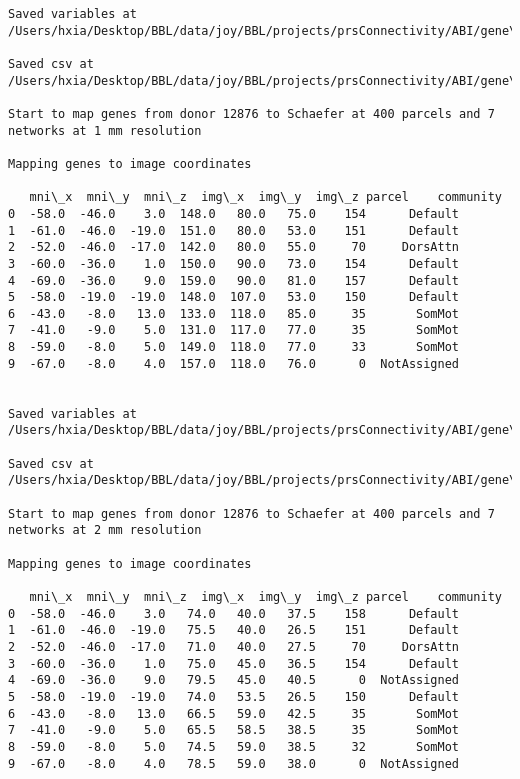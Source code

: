 \documentclass[11pt]{article}
\begin{document}
\begin{Verbatim}[commandchars=\\\{\}]
Saved variables at /Users/hxia/Desktop/BBL/data/joy/BBL/projects/prsConnectivity/ABI/gene\_mapping/12876donor\_200Parcels\_17Network\_2mm.pkl

Saved csv at /Users/hxia/Desktop/BBL/data/joy/BBL/projects/prsConnectivity/ABI/gene\_mapping/12876donor\_200Parcels\_17Network\_2mm.csv

Start to map genes from donor 12876 to Schaefer at 400 parcels and 7 networks at 1 mm resolution

Mapping genes to image coordinates

   mni\_x  mni\_y  mni\_z  img\_x  img\_y  img\_z parcel    community
0  -58.0  -46.0    3.0  148.0   80.0   75.0    154      Default
1  -61.0  -46.0  -19.0  151.0   80.0   53.0    151      Default
2  -52.0  -46.0  -17.0  142.0   80.0   55.0     70     DorsAttn
3  -60.0  -36.0    1.0  150.0   90.0   73.0    154      Default
4  -69.0  -36.0    9.0  159.0   90.0   81.0    157      Default
5  -58.0  -19.0  -19.0  148.0  107.0   53.0    150      Default
6  -43.0   -8.0   13.0  133.0  118.0   85.0     35       SomMot
7  -41.0   -9.0    5.0  131.0  117.0   77.0     35       SomMot
8  -59.0   -8.0    5.0  149.0  118.0   77.0     33       SomMot
9  -67.0   -8.0    4.0  157.0  118.0   76.0      0  NotAssigned


Saved variables at /Users/hxia/Desktop/BBL/data/joy/BBL/projects/prsConnectivity/ABI/gene\_mapping/12876donor\_400Parcels\_7Network\_1mm.pkl

Saved csv at /Users/hxia/Desktop/BBL/data/joy/BBL/projects/prsConnectivity/ABI/gene\_mapping/12876donor\_400Parcels\_7Network\_1mm.csv

Start to map genes from donor 12876 to Schaefer at 400 parcels and 7 networks at 2 mm resolution

Mapping genes to image coordinates

   mni\_x  mni\_y  mni\_z  img\_x  img\_y  img\_z parcel    community
0  -58.0  -46.0    3.0   74.0   40.0   37.5    158      Default
1  -61.0  -46.0  -19.0   75.5   40.0   26.5    151      Default
2  -52.0  -46.0  -17.0   71.0   40.0   27.5     70     DorsAttn
3  -60.0  -36.0    1.0   75.0   45.0   36.5    154      Default
4  -69.0  -36.0    9.0   79.5   45.0   40.5      0  NotAssigned
5  -58.0  -19.0  -19.0   74.0   53.5   26.5    150      Default
6  -43.0   -8.0   13.0   66.5   59.0   42.5     35       SomMot
7  -41.0   -9.0    5.0   65.5   58.5   38.5     35       SomMot
8  -59.0   -8.0    5.0   74.5   59.0   38.5     32       SomMot
9  -67.0   -8.0    4.0   78.5   59.0   38.0      0  NotAssigned



\end{Verbatim}
\end{document}
